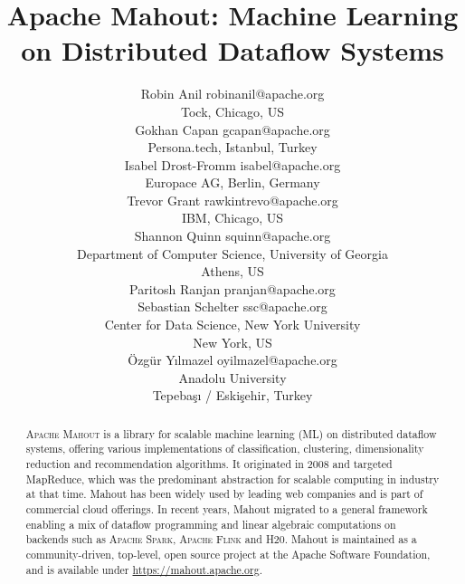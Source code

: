 \documentclass[twoside,11pt]{article}
\begin{document}
\title{Apache Mahout: Machine Learning on Distributed Dataflow Systems}

\author{\name Robin Anil \email robinanil@apache.org\\
  \addr Tock, Chicago, US\\
  \name Gokhan Capan \email gcapan@apache.org\\
  \addr Persona.tech, Istanbul, Turkey\\
  \name Isabel Drost-Fromm \email isabel@apache.org\\
  \addr Europace AG, Berlin, Germany\\
  \name Trevor Grant \email rawkintrevo@apache.org\\
  \addr IBM, Chicago, US\\
  \name Shannon Quinn \email squinn@apache.org\\
  \addr Department of Computer Science, University of Georgia\\
  \addr Athens, US\\ 
  \name Paritosh Ranjan \email pranjan@apache.org\\
  \name Sebastian Schelter \email ssc@apache.org\\
  \addr Center for Data Science, New York University\\
  \addr New York, US\\
  \name Özgür Yılmazel \email oyilmazel@apache.org\\
  \addr Anadolu University\\
  \addr Tepebaşı / Eskişehir, Turkey\\
}

\editor{}

\maketitle

\begin{abstract}%
\textsc{Apache Mahout} is a library for scalable machine learning (ML) on distributed dataflow systems, offering various implementations of classification, clustering, dimensionality reduction and recommendation algorithms. It originated in 2008 and targeted MapReduce, which was the predominant abstraction for scalable computing in industry at that time. Mahout has been widely used by leading web companies and is part of commercial cloud offerings. In recent years, Mahout migrated to a general framework enabling a mix of dataflow programming and linear algebraic computations on backends such as \textsc{Apache Spark}, \textsc{Apache Flink} and \textsc{H20}. Mahout is maintained as a community-driven, top-level, open source project at the Apache Software Foundation, and is available under \url{https://mahout.apache.org}. 
\end{abstract}
\end{document}
